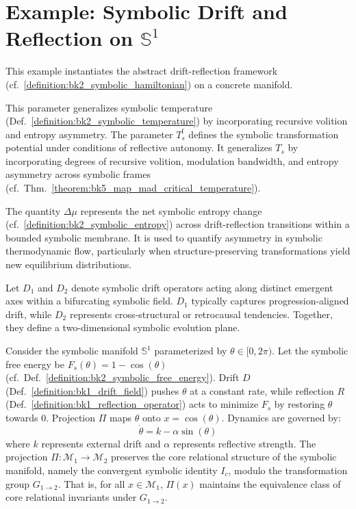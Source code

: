 \section[\texorpdfstring{Example: Symbolic Drift on $\mathbb{S}^1$}{Example: Symbolic Drift on S\^{}1}]{Example: Symbolic Drift and Reflection on $\mathbb{S}^1$}
\label{sec:bk8_example}
This example instantiates the abstract drift-reflection framework (cf.~\ref{definition:bk2_symbolic_hamiltonian}) on a concrete manifold.
\begin{definition}
\label{definition:bk8_temperature_freedom}
This parameter generalizes symbolic temperature (Def.~\ref{definition:bk2_symbolic_temperature}) by incorporating recursive volition and entropy asymmetry.
The parameter \(T_s^{\mathrm{f}}\) defines the symbolic transformation potential under conditions of reflective autonomy. It generalizes \(T_s\) by incorporating degrees of recursive volition, modulation bandwidth, and entropy asymmetry across symbolic frames (cf.~Thm.~\ref{theorem:bk5_map_mad_critical_temperature}).
\end{definition}
\begin{definition}
\label{definition:bk8_entropy_shift}
The quantity \(\Delta \mu\) represents the net symbolic entropy change (cf.~\ref{definition:bk2_symbolic_entropy}) across drift-reflection transitions within a bounded symbolic membrane. It is used to quantify asymmetry in symbolic thermodynamic flow, particularly when structure-preserving transformations yield new equilibrium distributions.
\end{definition}
\begin{definition}
\label{definition:bk8_structural_regulators}
Let \(D_1\) and \(D_2\) denote symbolic drift operators acting along distinct emergent axes within a bifurcating symbolic field. \(D_1\) typically captures progression-aligned drift, while \(D_2\) represents cross-structural or retrocausal tendencies. Together, they define a two-dimensional symbolic evolution plane.
\end{definition}
Consider the symbolic manifold $\mathbb{S}^1$ parameterized by $\theta \in [0, 2\pi)$. Let the symbolic free energy be $F_s(\theta) = 1 - \cos(\theta)$ (cf.~Def.~\ref{definition:bk2_symbolic_free_energy}).
Drift $D$ (Def.~\ref{definition:bk1_drift_field}) pushes $\theta$ at a constant rate, while reflection $R$ (Def.~\ref{definition:bk1_reflection_operator}) acts to minimize $F_s$ by restoring $\theta$ towards $0$.
Projection $\Pi$ maps $\theta$ onto $x = \cos(\theta)$.
Dynamics are governed by:
\[
\dot{\theta} = k - \alpha \sin(\theta)
\]
where $k$ represents external drift and $\alpha$ represents reflective strength.
\noindent
The projection $\Pi : \mathcal{M}_1 \to \mathcal{M}_2$ preserves the core relational structure of the symbolic manifold, namely the convergent symbolic identity $I_c$, modulo the transformation group $G_{1\to2}$. That is, for all $x \in \mathcal{M}_1$, $\Pi(x)$ maintains the equivalence class of core relational invariants under $G_{1\to2}$.
